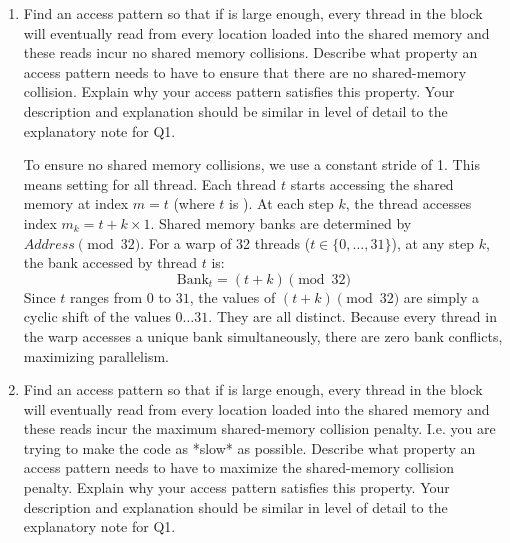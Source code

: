 \documentclass{article}
\newenvironment{answer}
{\par\color{blue}}
{\normalfont\par}
\begin{document}
\begin{enumerate}
          \begin{enumerate}
              \item Find an access pattern so that if  is large enough, every thread in the block will eventually read from every location loaded into the shared memory and these reads incur no shared memory collisions. Describe what property an access pattern needs to have to ensure that there are no shared-memory collision. Explain why your access pattern satisfies this property. Your description and explanation should be similar in level of detail to the explanatory note for Q1.

                    \begin{answer}
                        To ensure no shared memory collisions, we use a constant stride of 1. This means setting  for all thread.
                        Each thread $t$ starts accessing the shared memory at index $m = t$ (where $t$ is ). At each step $k$, the thread accesses index $m_k = t + k \times 1$.
                        Shared memory banks are determined by $Address \pmod{32}$.
                        For a warp of 32 threads ($t \in \{0, \dots, 31\}$), at any step $k$, the bank accessed by thread $t$ is:
                        $$ \textrm{Bank}_t = (t + k) \pmod{32} $$
                        Since $t$ ranges from $0$ to $31$, the values of $(t+k) \pmod{32}$ are simply a cyclic shift of the values $0 \dots 31$. They are all distinct.
                        Because every thread in the warp accesses a unique bank simultaneously, there are zero bank conflicts, maximizing parallelism.
                    \end{answer}

              \item Find an access pattern so that if  is large enough, every thread in the block will eventually read from every location loaded into the shared memory and these reads incur the maximum shared-memory collision penalty. I.e. you are trying to make the code as *slow* as possible. Describe what property an access pattern needs to have to maximize the shared-memory collision penalty. Explain why your access pattern satisfies this property. Your description and explanation should be similar in level of detail to the explanatory note for Q1.


\end{enumerate}
\end{enumerate}
\end{document}
